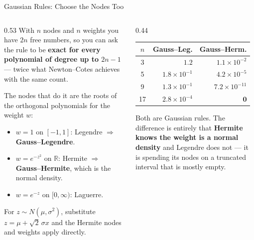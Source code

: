 \begin{frame}{Gaussian Rules: Choose the Nodes Too}
\begin{columns}[T]
\begin{column}{0.53\textwidth}
\small
With $n$ nodes and $n$ weights you have $2n$ free numbers, so you can ask the rule to be \textbf{exact for every polynomial of degree up to $2n-1$} --- twice what Newton--Cotes achieves with the same count.
\medskip

The nodes that do it are the roots of the orthogonal polynomials for the weight $w$:
\begin{itemize}\footnotesize
  \item $w=1$ on $[-1,1]$: Legendre $\Rightarrow$ \textbf{Gauss--Legendre}.
  \item $w=e^{-z^{2}}$ on $\mathbb{R}$: Hermite $\Rightarrow$ \textbf{Gauss--Hermite}, which is the normal density.
  \item $w=e^{-z}$ on $[0,\infty)$: Laguerre.
\end{itemize}
\medskip
For $z\sim N(\mu,\sigma^{2})$, substitute $z=\mu+\sqrt2\,\sigma x$ and the Hermite nodes and weights apply directly.
\end{column}
\begin{column}{0.44\textwidth}
\begin{center}\footnotesize
\begin{tabularx}{\linewidth}{@{}c r r@{}}
\toprule
$n$ & \textbf{Gauss--Leg.} & \textbf{Gauss--Herm.} \\
\midrule
3 & $1.2$ & $1.1\times10^{-2}$ \\
5 & $1.8\times10^{-1}$ & $4.2\times10^{-5}$ \\
9 & $1.3\times10^{-1}$ & $7.2\times10^{-11}$ \\
17 & $2.8\times10^{-4}$ & $\mathbf{0}$ \\
\bottomrule
\end{tabularx}
\end{center}
\vspace{1mm}
\begin{takeawaybox}\footnotesize
Both are Gaussian rules. The difference is entirely that \textbf{Hermite knows the weight is a normal density} and Legendre does not --- it is spending its nodes on a truncated interval that is mostly empty.
\end{takeawaybox}
\end{column}
\end{columns}
\end{frame}

